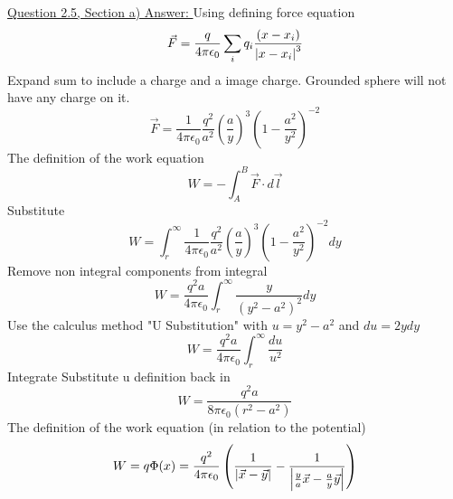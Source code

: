 \documentclass[12pt]{article}
\begin{document}
    \underline{Question 2.5, Section a) Answer: }
    \newline Using defining force equation
    \begin{equation} \label{eq: 3.1.1}
        \vec{F} = \frac{q}{4 \pi \epsilon_0} \sum_i q_i \frac{(x-x_i)}{\abs{x-x_i}^3}
    \end{equation}
    Expand sum to include a charge and a image charge. Grounded sphere will not have any charge on it. 
    \begin{equation} \label{eq: 3.1.2}
        \vec{F} = \frac{1}{4 \pi \epsilon_0} \frac{q^2}{a^2} \left(\frac{a}{y} \right)^3 \left(1 - \frac{a^2}{y^2} \right)^{-2}
    \end{equation}
    The definition of the work equation
    \begin{equation} \label{eq: 3.1.3}
        W = - \int_A^B \vec{F} \cdot d\vec{l}
    \end{equation}
    Substitute
    \begin{equation} \label{eq: 3.1.4}
        W = \int_r^\infty \frac{1}{4 \pi \epsilon_0} \frac{q^2}{a^2} \left(\frac{a}{y} \right)^3 \left(1 - \frac{a^2}{y^2} \right)^{-2} dy
    \end{equation}
    Remove non integral components from integral
    \begin{equation} \label{eq: 3.1.5}
        W =  \frac{q^2 a}{4 \pi \epsilon_0} \int_r^\infty \frac{y}{(y^2 - a^2)^2} dy
    \end{equation}
    Use the calculus method "U Substitution" with $u=y^2 - a^2$ and $du=2ydy$
    \begin{equation} \label{eq: 3.1.6}
        W =  \frac{q^2 a}{4 \pi \epsilon_0} \int_r^\infty \frac{du}{u^2}
    \end{equation}
    Integrate
    \newline Substitute u definition back in
    \begin{equation} \label{eq: 3.1.7}
        W = \frac{q^2 a}{8 \pi \epsilon_0 (r^2 - a^2)}
    \end{equation}
    The definition of the work equation (in relation to the potential)
    \begin{equation} \label{eq: 3.1.8}
        W = q \Phi(x) = \frac{q^2}{4 \pi \epsilon_0} \left(\frac{1}{\abs{\vec{x}-\vec{y}}} - \frac{1}{\abs{\frac{y}{a} \vec{x} - \frac{a}{y} \vec{y}}} \right)
    \end{equation}
\end{document}

